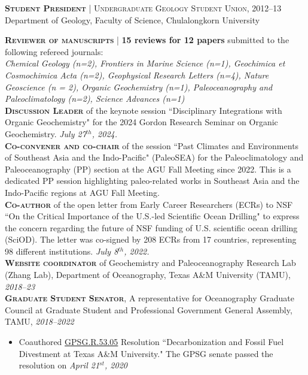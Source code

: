 \documentclass[10pt]{article}
\newcommand{\margintext}[1]{\marginnote{\normalsize\textbf #1 |}}
\begin{document}
\bigskip
\textsc{\textbf{Student President}} | \textsc{Undergraduate Geology Student Union}, 2012–13 \\
Department of Geology, Faculty of Science, Chulalongkorn University

\bigskip
\margintext{Services}
\textsc{\textbf{Reviewer of manuscripts}} | \textbf{15 reviews for 12 papers} submitted to the following refereed journals: \\
\textit{Chemical Geology (n=2), Frontiers in Marine Science (n=1), Geochimica et Cosmochimica Acta (n=2), Geophysical Research Letters (n=4), Nature Geoscience (n = 2), Organic Geochemistry (n=1), Paleoceanography and Paleoclimatology (n=2), Science Advances (n=1)} \\

\textsc{\textbf{Discussion Leader}} of the keynote session ``Disciplinary Integrations with Organic Geochemistry" for the 2024 Gordon Research Seminar on Organic Geochemistry. \textit{July 27$^{th}$, 2024.} \\

\textsc{\textbf{Co-convener and co-chair}} of the session ``Past Climates and Environments of Southeast Asia and the Indo-Pacific" (PaleoSEA) for the Paleoclimatology and Paleoceanography (PP) section at the AGU Fall Meeting since 2022. This is a dedicated PP session highlighting paleo-related works in Southeast Asia and the Indo-Pacific regions at AGU Fall Meeting. \\

\textsc{\textbf{Co-author}} of the open letter from Early Career Researchers (ECRs) to NSF ``On the Critical Importance of the U.S.-led Scientific Ocean Drilling" to express the concern regarding the future of NSF funding of U.S. scientific ocean drilling (SciOD). The letter was co-signed by 208 ECRs from 17 countries, representing 98 different institutions. \textit{July 8$^{th}$, 2022.} \\

\textsc{\textbf{Website coordinator}} of Geochemistry and Paleoceanography Research Lab (Zhang Lab), Department of Oceanography, Texas A\&M University (TAMU), \textit{2018–23} \\

\textsc{\textbf{Graduate Student Senator}}, A representative for Oceanography Graduate Council at Graduate Student and Professional Government General Assembly, TAMU, \textit{2018–2022} \\
\begin{itemize}[noitemsep,nolistsep,leftmargin=*]
    \item Coauthored \href{https://gpsg.tamu.edu/resolutions-and-bills/}{GPSG.R.53.05} Resolution ``Decarbonization and Fossil Fuel Divestment at Texas A\&M University." The GPSG senate passed the resolution on \textit{April 21$^{st}$, 2020}
\end{itemize}
\end{document}
